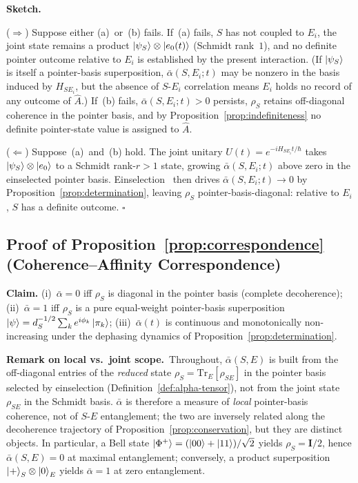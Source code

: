\textbf{Sketch.}

($\Rightarrow$)
Suppose either (a)~or~(b) fails.
If~(a) fails, $S$ has not coupled to $E_i$, the joint state remains a
product $\ket{\psi_S}\otimes\ket{e_0(t)}$ (Schmidt rank~$1$), and no
definite pointer outcome relative to $E_i$ is established by the
present interaction.
(If $\ket{\psi_S}$ is itself a pointer-basis superposition,
$\bar\alpha(S,E_i;t)$ may be nonzero in the basis induced by
$H_{SE_i}$, but the absence of $S$-$E_i$ correlation means $E_i$ holds
no record of any outcome of $\hat{A}$.)
If~(b) fails, $\bar\alpha(S,E_i;t) > 0$ persists, $\rho_S$ retains
off-diagonal coherence in the pointer basis, and by
Proposition~\ref{prop:indefiniteness} no definite pointer-state value
is assigned to $\hat{A}$.

($\Leftarrow$)
Suppose~(a)~and~(b) hold.
The joint unitary $U(t) = e^{-iH_{SE_i}t/\hbar}$ takes
$\ket{\psi_S}\otimes\ket{e_0}$ to a Schmidt rank-$r>1$ state, growing
$\bar\alpha(S,E_i;t)$ above zero in the einselected pointer basis.
Einselection~\cite{Zurek2003} then drives
$\bar\alpha(S,E_i;t)\to 0$ by Proposition~\ref{prop:determination},
leaving $\rho_S$ pointer-basis-diagonal: relative to $E_i$, $S$ has a
definite outcome. $\square$

\subsection{Proof of Proposition~\ref{prop:correspondence} (Coherence--Affinity Correspondence)}

\textbf{Claim.} (i)~$\bar\alpha = 0$ iff $\rho_S$ is diagonal in the
pointer basis (complete decoherence);
(ii)~$\bar\alpha = 1$ iff $\rho_S$ is a pure equal-weight pointer-basis
superposition $\ket{\psi} = d_S^{-1/2}\sum_k e^{i\phi_k}\ket{\pi_k}$;
(iii)~$\bar\alpha(t)$ is continuous and monotonically non-increasing
under the dephasing dynamics of Proposition~\ref{prop:determination}.

\textbf{Remark on local vs.\ joint scope.}~Throughout, $\bar\alpha(S,E)$
is built from the off-diagonal entries of the \emph{reduced} state
$\rho_S = \mathrm{Tr}_E[\rho_{SE}]$ in the pointer basis selected by
einselection (Definition~\ref{def:alpha-tensor}), not from the joint
state $\rho_{SE}$ in the Schmidt basis.
$\bar\alpha$ is therefore a measure of \emph{local} pointer-basis
coherence, not of $S$-$E$ entanglement; the two are inversely related
along the decoherence trajectory of
Proposition~\ref{prop:conservation}, but they are distinct objects.
In particular, a Bell state $\ket{\Phi^+} = (\ket{00}+\ket{11})/\sqrt{2}$
yields $\rho_S = \mathbf{I}/2$, hence $\bar\alpha(S,E) = 0$ at maximal
entanglement; conversely, a product superposition
$\ket{+}_S\otimes\ket{0}_E$ yields $\bar\alpha = 1$ at zero
entanglement.

